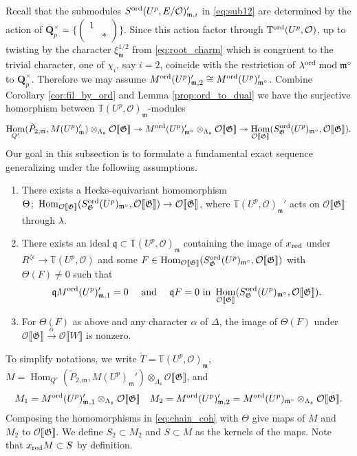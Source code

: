 \documentclass[leqno]{amsart}
\theoremstyle{definition}
\theoremstyle{remark}
\newcommand{\smat}[1]{\left(\begin{smallmatrix} #1 \end{smallmatrix}\right)}
\newcommand{\oo}{\mathcal{O}}
\newcommand{\Qp}{\mathbf{Q}_p}
\DeclareMathOperator{\Hom}{Hom}
\newcommand{\fm}{\mathfrak{m}}
\newcommand{\fq}{\mathfrak{q}}
\newcommand{\fs}{\mathfrak{s}}
\newcommand{\xx}{x_\textnormal{red}}
\newcommand{\fG}{\mathfrak{G}}
\newcommand{\TT}{\mathbb{T}} %
\newcommand{\ord}{\textnormal{ord}} %
\begin{document}
Recall that the submodules
$S^{\ord}(U^p,E/\oo)_{\fm,i}'$
in \eqref{eq:sub12}
are determined by the action
of $\Qp^\times=\{\smat{1&\\&*}\}$.
Since this action
factor through $\TT^{\ord}(U^p,\oo)$,
up to twisting by the character
$\xi_\fm^{1/2}$ from \eqref{eq:root_charm}
which is congruent to the trivial character,
one of $\chi_i$, say $i=2$, coincide with 
the restriction of $\lambda^{\ord}\bmod\fm^\circ$
to $\Qp^\times$. Therefore we may assume
$M^{\ord}(U^p)_{\fm,2}'\cong M^{\ord}(U^p)'_{\fm^\circ}$.
Combine Corollary \ref{cor:fil_by_ord}
and Lemma \ref{prop:ord_to_dual}
we have the surjective homorphism between 
$\TT(U^p,\oo)_\fm$-modules
\begin{equation}\label{eq:chain_coh}
    \Hom_{Q'}(\tilde{P}_{2,\fm}, M(U^p)_\fm')
    \otimes_{\Lambda_{\fs}}\oo\llbracket\fG\rrbracket
    \twoheadrightarrow
    M^{\ord}(U^p)_{\fm^\circ}'
    \otimes_{\Lambda_{\fs}}\oo\llbracket\fG\rrbracket
    \twoheadrightarrow
    \Hom_{\oo\llbracket\fG\rrbracket}
    (S^{\ord}_\fG(U^p)_{\fm^\circ},
    \oo\llbracket\fG\rrbracket).
\end{equation}
Our goal in this subsection
is to formulate a fundamental exact sequence 
generalizing \cite[Prop 6.3.5]{urban}
under the following assumptions.
\begin{enumerate}[label=(C\arabic*)]
\item There exists a Hecke-equivariant homomorphism
$\Theta\colon
\Hom_{\oo\llbracket\fG\rrbracket}
(S^{\ord}_\fG(U^p)_{\fm^\circ},
\oo\llbracket\fG\rrbracket)\to 
\oo\llbracket\fG\rrbracket$,
where $\TT(U^p,\oo)_{\fm}'$
acts on 
$\oo\llbracket\fG\rrbracket$ through $\lambda$.
\label{cond:C1}
\item There exists an ideal 
$\fq\subset \TT(U^p,\oo)_{\fm}$
containing the image of $\xx$ under 
$R^{\zeta\epsilon}\to \TT(U^p,\oo)$
and some $F\in \Hom_{\oo\llbracket\fG\rrbracket}
(S^{\ord}_\fG(U^p)_{\fm^\circ},
\oo\llbracket\fG\rrbracket)$
with $\Theta(F)\neq 0$
such that
\[
    \fq M^{\ord}(U^p)_{\fm,1}'=0\quad
    \text{ and }\quad
    \fq F=0 \text{ in }
    \Hom_{\oo\llbracket\fG\rrbracket}
    (S^{\ord}_\fG(U^p)_{\fm^\circ},
    \oo\llbracket\fG\rrbracket).
\]
\label{cond:C2}
\item For $\Theta(F)$ as above 
and any character $\alpha$ of $\Delta$,
the image of $\Theta(F)$ under
$\oo\llbracket\fG\rrbracket\xrightarrow{\alpha}
\oo\llbracket W\rrbracket$
is nonzero.
\label{cond:C3}
\end{enumerate}

To simplify notations, 
we write
$\tilde{T}=\TT(U^p,\oo)_{\fm}$,
$M=\Hom_{Q'}(\tilde{P}_{2,\fm},M(U^p)_{\fm}')
\otimes_{\Lambda_{\fs}}\oo\llbracket\fG\rrbracket$, and
\[
M_1=M^{\ord}(U^p)_{\fm,1}'
\otimes_{\Lambda_{\fs}}\oo\llbracket\fG\rrbracket
\quad
M_2=M^{\ord}(U^p)_{\fm,2}'=M^{\ord}(U^p)_{\fm^\circ}
\otimes_{\Lambda_{\fs}}\oo\llbracket\fG\rrbracket.
\]
Composing the homomorphisms in \eqref{eq:chain_coh}
with $\Theta$
give maps of $M$ and $M_2$ to 
$\oo\llbracket\fG\rrbracket$.
We define $S_2\subset M_2$ and
$S\subset M$ as the kernels of the maps.
Note that $\xx M\subset S$ by definition.
\end{document}

